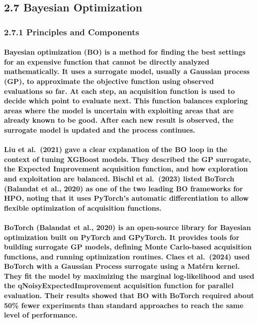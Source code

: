 \subsection{2.7 Bayesian Optimization}\label{bayesian-optimization}

\subsubsection{2.7.1 Principles and
Components}\label{principles-and-components}

\paragraph{Bayesian optimization (BO) is a method for finding the best settings for an expensive function that cannot be directly analyzed mathematically. It uses a surrogate model, usually a Gaussian process (GP), to approximate the objective function using observed evaluations so far. At each step, an acquisition function is used to decide which point to evaluate next. This function balances exploring areas where the model is uncertain with exploiting areas that are already known to be good. After each new result is observed, the surrogate model is updated and the process continues.}

\paragraph{Liu et al. (2021) gave a clear explanation of the BO loop in the context of tuning XGBoost models. They described the GP surrogate, the Expected Improvement acquisition function, and how exploration and exploitation are balanced. Bischl et al. (2023) listed BoTorch (Balandat et al., 2020) as one of the two leading BO frameworks for HPO, noting that it uses PyTorch’s automatic differentiation to allow flexible optimization of acquisition functions.}

\paragraph{BoTorch (Balandat et al., 2020) is an open-source library for Bayesian optimization built on PyTorch and GPyTorch. It provides tools for building surrogate GP models, defining Monte Carlo-based acquisition functions, and running optimization routines. Claes et al. (2024) used BoTorch with a Gaussian Process surrogate using a Matérn kernel. They fit the model by maximizing the marginal log-likelihood and used the qNoisyExpectedImprovement acquisition function for parallel evaluation. Their results showed that BO with BoTorch required about 50\% fewer experiments than standard approaches to reach the same level of performance.}

